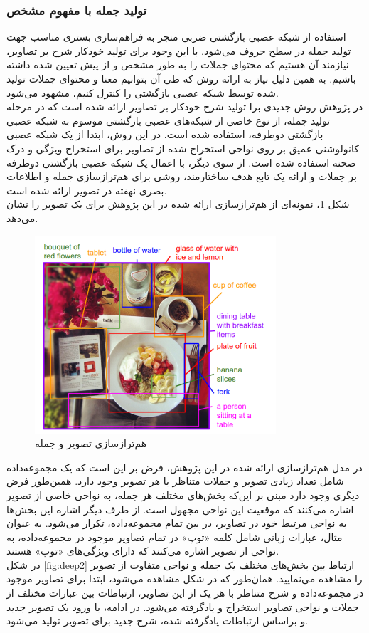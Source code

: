 \subsubsection{تولید جمله با مفهوم مشخص}
استفاده از شبکه عصبی بازگشتی ضربی منجر به فراهم‌سازی بستری مناسب جهت تولید جمله در سطح حروف می‌شود. با این وجود برای تولید خودکار شرح بر تصاویر، نیازمند آن‌ هستیم که محتوای جملات را به طور مشخص و از پیش تعیین شده داشته باشیم. به همین دلیل نیاز به ارائه روش که طی آن بتوانیم معنا و محتوای جملات تولید شده توسط شبکه عصبی بازگشتی را کنترل کنیم، مشهود می‌شود.
\\
در پژوهش \cite{karpathy2015deep} روش جدیدی برا تولید شرح خودکار بر تصاویر ارائه شده است که در مرحله تولید جمله، از نوع خاصی از شبکه‌های عصبی بازگشتی موسوم به شبکه عصبی بازگشتی دوطرفه، استفاده  شده است. در این روش، ابتدا از یک شبکه عصبی کانولوشنی عمیق بر روی نواحی استخراج شده از تصاویر برای استخراج ویژگی و درک صحنه استفاده شده است. از سوی دیگر، با اعمال یک شبکه عصبی بازگشتی دوطرفه بر جملات و ارائه یک تابع هدف ساختارمند، روشی برای هم‌ترازسازی جمله و اطلاعات بصری نهفته در تصویر ارائه شده است.
\\

شکل \ref{fig:deep1}، نمونه‌ای از هم‌ترازسازی ارائه شده در این پژوهش برای یک تصویر را نشان می‌دهد.
\begin{figure}[H]
\center
\includegraphics[scale=0.6]{Imgs/sentence_deep1.png}
\caption{هم‌ترازسازی تصویر و جمله\cite{karpathy2015deep}}
\label{fig:deep1}
\end{figure}

در مدل هم‌ترازسازی ارائه شده در این پژوهش، فرض بر این است که یک مجموعه‌داده شامل تعداد زیادی تصویر و جملات متناظر با هر تصویر وجود دارد. همین‌طور فرض دیگری وجود دارد مبنی بر این‌که بخش‌های مختلف هر جمله، به نواحی خاصی از تصویر اشاره‌ می‌کنند که موقعیت این نواحی مجهول است. از طرف دیگر اشاره این بخش‌ها به نواحی مرتبط خود در تصاویر، در بین تمام مجمو‌‌عه‌داده، تکرار می‌شود. به عنوان مثال، عبارات زبانی شامل کلمه «توپ» در تمام تصاویر موجود در مجموعه‌داده، به نواحی از تصویر اشاره می‌کنند که دارای ويژگی‌های «توپ» هستند.
\\
در شکل \ref{fig:deep2} ارتباط بین بخش‌های مختلف یک جمله و نواحی متفاوت از تصویر را مشاهده می‌نمایید. همان‌طور که در شکل مشاهده می‌شود، ابتدا برای تصاویر موجود در مجموعه‌داده و شرح متناظر با هر یک از این تصاویر، ارتباطات بین عبارات مختلف از جملات و نواحی تصاویر استخراج و یادگرفته می‌شود. در ادامه، با ورود یک  تصویر جدید و براساس ارتباطات یادگرفته شده، شرح جدید برای تصویر تولید می‌شود.

